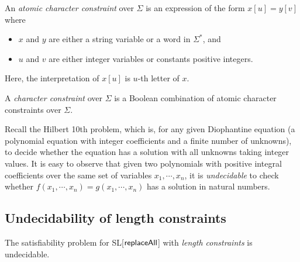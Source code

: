 \begin{definition}
	An \emph{atomic character constraint} over $\Sigma$ is an expression of the form $x[u]=y[v]$ where 
	\begin{itemize}
		\item $x$ and $y$ are either a string variable or a word in $\Sigma^*$, and 
		\item $u$ and $v$ are either integer variables or constants positive integers.
	\end{itemize} 
Here, the interpretation of $x[u]$ is $u$-th letter of $x$.	
	
A \emph{character constraint} over $\Sigma$ is a Boolean combination of atomic character constraints over $\Sigma$. 
\end{definition}


Recall the Hilbert 10th problem, which is, for any given Diophantine equation (a polynomial equation with integer coefficients and a finite number of unknowns), to decide whether the equation has a solution with all unknowns taking integer values. It is easy to observe that given two polynomials with positive integral coefficients over the same set of variables $x_1, \cdots, x_n$, it is \emph{undecidable} to check whether $f(x_1, \cdots, x_n)=g(x_1, \cdots, x_n)$ has a solution in natural numbers. 

\subsection{Undecidability of length constraints}

\begin{theorem}
	The satisfiability problem for SL[$\mathsf{replaceAll}$] with \emph{length constraints} is undecidable. 
\end{theorem}

